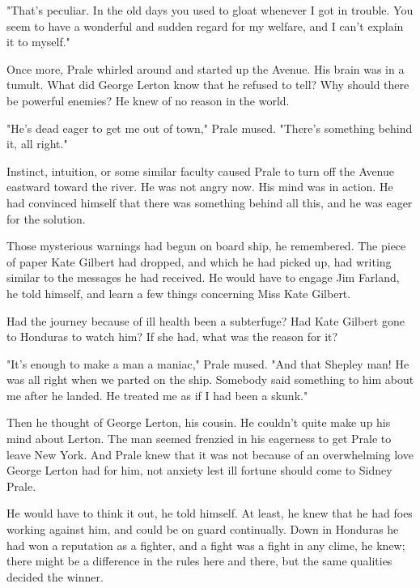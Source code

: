 \documentclass{novel}
\begin{document}
"That's peculiar. In the old days you used to gloat whenever I got in trouble. You seem to have a wonderful and sudden regard for my welfare, and I can't explain it to myself."

Once more, Prale whirled around and started up the Avenue. His brain was in a tumult. What did George Lerton know that he refused to tell? Why should there be powerful enemies? He knew of no reason in the world.

"He's dead eager to get me out of town," Prale mused. "There's something behind it, all right."

\vspace{2\nbs}
\clearpage
\thispagestyle{empty}

\begin{ChapterStart}
\vspace{3\nbs}
\end{ChapterStart}
    
Instinct, intuition, or some similar faculty caused Prale to turn off the Avenue eastward toward the river. He was not angry now. His mind was in action. He had convinced himself that there was something behind all this, and he was eager for the solution.

Those mysterious warnings had begun on board ship, he remembered. The piece of paper Kate Gilbert had dropped, and which he had picked up, had writing similar to the messages he had received. He would have to engage Jim Farland, he told himself, and learn a few things concerning Miss Kate Gilbert.

Had the journey because of ill health been a subterfuge? Had Kate Gilbert gone to Honduras to watch him? If she had, what was the reason for it?

"It's enough to make a man a maniac," Prale mused. "And that Shepley man! He was all right when we parted on the ship. Somebody said something to him about me after he landed. He treated me as if I had been a skunk."

Then he thought of George Lerton, his cousin. He couldn't quite make up his mind about Lerton. The man seemed frenzied in his eagerness to get Prale to leave New York. And Prale knew that it was not because of an overwhelming love George Lerton had for him, not anxiety lest ill fortune should come to Sidney Prale.

He would have to think it out, he told himself. At least, he knew that he had foes working against him, and could be on guard continually. Down in Honduras he had won a reputation as a fighter, and a fight was a fight in any clime, he knew; there might be a difference in the rules here and there, but the same qualities decided the winner.
\end{document}
